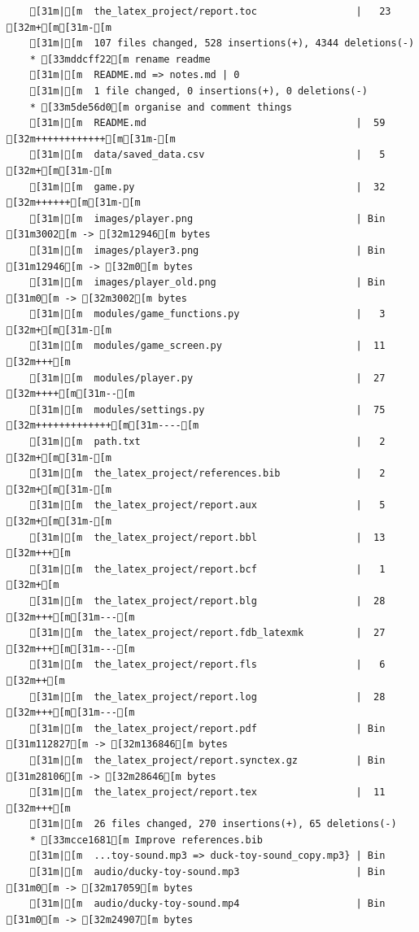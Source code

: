 \documentclass{article}
\begin{document}
{\begin{verbatim}
    [31m|[m  the_latex_project/report.toc                 |   23 [32m+[m[31m-[m
    [31m|[m  107 files changed, 528 insertions(+), 4344 deletions(-)
    * [33mddcff22[m rename readme
    [31m|[m  README.md => notes.md | 0
    [31m|[m  1 file changed, 0 insertions(+), 0 deletions(-)
    * [33m5de56d0[m organise and comment things
    [31m|[m  README.md                                    |  59 [32m++++++++++++[m[31m-[m
    [31m|[m  data/saved_data.csv                          |   5 [32m+[m[31m-[m
    [31m|[m  game.py                                      |  32 [32m++++++[m[31m-[m
    [31m|[m  images/player.png                            | Bin [31m3002[m -> [32m12946[m bytes
    [31m|[m  images/player3.png                           | Bin [31m12946[m -> [32m0[m bytes
    [31m|[m  images/player_old.png                        | Bin [31m0[m -> [32m3002[m bytes
    [31m|[m  modules/game_functions.py                    |   3 [32m+[m[31m-[m
    [31m|[m  modules/game_screen.py                       |  11 [32m+++[m
    [31m|[m  modules/player.py                            |  27 [32m++++[m[31m--[m
    [31m|[m  modules/settings.py                          |  75 [32m+++++++++++++[m[31m----[m
    [31m|[m  path.txt                                     |   2 [32m+[m[31m-[m
    [31m|[m  the_latex_project/references.bib             |   2 [32m+[m[31m-[m
    [31m|[m  the_latex_project/report.aux                 |   5 [32m+[m[31m-[m
    [31m|[m  the_latex_project/report.bbl                 |  13 [32m+++[m
    [31m|[m  the_latex_project/report.bcf                 |   1 [32m+[m
    [31m|[m  the_latex_project/report.blg                 |  28 [32m+++[m[31m---[m
    [31m|[m  the_latex_project/report.fdb_latexmk         |  27 [32m+++[m[31m---[m
    [31m|[m  the_latex_project/report.fls                 |   6 [32m++[m
    [31m|[m  the_latex_project/report.log                 |  28 [32m+++[m[31m---[m
    [31m|[m  the_latex_project/report.pdf                 | Bin [31m112827[m -> [32m136846[m bytes
    [31m|[m  the_latex_project/report.synctex.gz          | Bin [31m28106[m -> [32m28646[m bytes
    [31m|[m  the_latex_project/report.tex                 |  11 [32m+++[m
    [31m|[m  26 files changed, 270 insertions(+), 65 deletions(-)
    * [33mcce1681[m Improve references.bib
    [31m|[m  ...toy-sound.mp3 => duck-toy-sound_copy.mp3} | Bin
    [31m|[m  audio/ducky-toy-sound.mp3                    | Bin [31m0[m -> [32m17059[m bytes
    [31m|[m  audio/ducky-toy-sound.mp4                    | Bin [31m0[m -> [32m24907[m bytes

\end{verbatim}}
\end{document}
